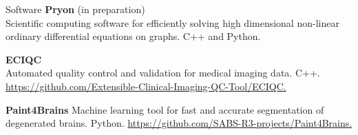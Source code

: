 \begin{rSection}{Software}
{\bf Pryon} (in preparation) \\
Scientific computing software for efficiently solving high dimensional non-linear ordinary differential equations on graphs. C++ and Python.

{\bf ECIQC} \\
Automated quality control and validation for medical imaging data. C++.  \href{https://github.com/Extensible-Clinical-Imaging-QC-Tool/ECIQC}{https://github.com/Extensible-Clinical-Imaging-QC-Tool/ECIQC.}

{\bf Paint4Brains}
Machine learning tool for fast and accurate segmentation of degenerated brains. Python. \href{https://github.com/SABS-R3-projects/Paint4Brains}{https://github.com/SABS-R3-projects/Paint4Brains.}
\end{rSection}